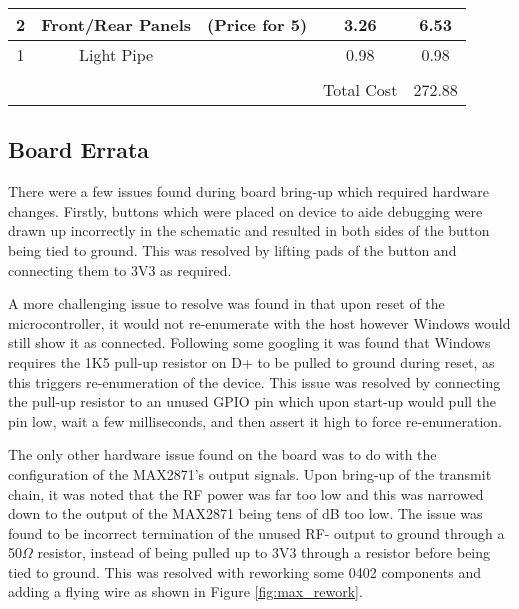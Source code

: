 \begin{table}[H]
\begin{tabular}{|c|c|c|c|c|}
		2                 & Front/Rear Panels         & (Price for 5)            & 3.26                                                                  & 6.53                                                                      \\ \hline
		1                 & Light Pipe                 &                          & 0.98                                                                   & 0.98                                                                       \\ \hline
		&                            &                          &                                                                        &                                                                            \\ \hline
		&                            &                          & Total Cost                                                             & 272.88                                                                    \\ \hline
	\end{tabular}
\end{table} 

\subsection{Board Errata}
There were a few issues found during board bring-up which required hardware changes. Firstly, buttons which were placed on device to aide debugging were drawn up incorrectly in the schematic and resulted in both sides of the button being tied to ground. This was resolved by lifting pads of the button and connecting them to 3V3 as required.

A more challenging issue to resolve was found in that upon reset of the microcontroller, it would not re-enumerate with the host however Windows would still show it as connected. Following some googling it was found that Windows requires the 1K5 pull-up resistor on D+ to be pulled to ground during reset, as this triggers re-enumeration of the device. This issue was resolved by connecting the pull-up resistor to an unused GPIO pin which upon start-up would pull the pin low, wait a few milliseconds, and then assert it high to force re-enumeration. 

The only other hardware issue found on the board was to do with the configuration of the MAX2871's output signals. Upon bring-up of the transmit chain, it was noted that the RF power was far too low and this was narrowed down to the output of the MAX2871 being tens of dB too low. The issue was found to be incorrect termination of the unused RF- output to ground through a 50$\Omega$ resistor, instead of being pulled up to 3V3 through a resistor before being tied to ground. This was resolved with reworking some 0402 components and adding a flying wire as shown in Figure \ref{fig:max_rework}.

